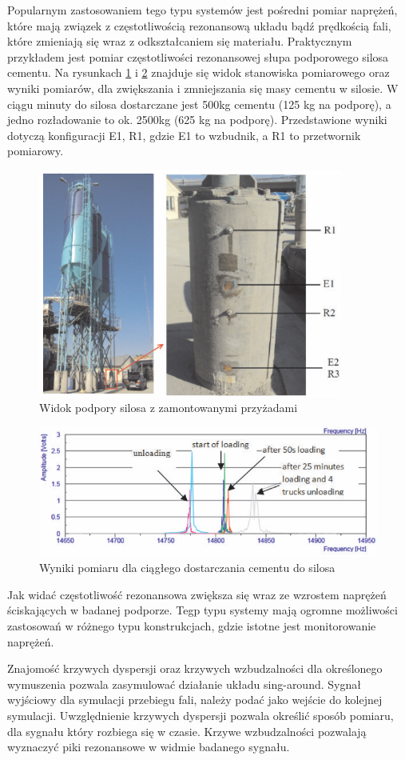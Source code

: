 Popularnym zastosowaniem tego typu systemów jest pośredni pomiar naprężeń, które mają związek z częstotliwością rezonansową układu bądź prędkością fali, które zmieniają się wraz z odkształcaniem się materiału. Praktycznym przykładem jest pomiar częstotliwości rezonansowej słupa podporowego silosa cementu. Na rysunkach \ref{fig:sing_around_silos} i \ref{fig:sing_around_wyniki} znajduje się widok stanowiska pomiarowego oraz wyniki pomiarów, dla zwiększania i zmniejszania się masy cementu w silosie. W ciągu minuty do silosa dostarczane jest 500kg cementu (125 kg na podporę), a jedno rozładowanie to ok. 2500kg (625 kg na podporę). Przedstawione wyniki dotyczą konfiguracji E1, R1, gdzie E1 to wzbudnik, a R1 to przetwornik pomiarowy.

\begin{figure}[h]
\centering
\includegraphics[width=10cm]{Zdjecia/2/sing_around_silos}
\caption{Widok podpory silosa z zamontowanymi przyżadami}
\label{fig:sing_around_silos}
\end{figure}

\begin{figure}[h]
\centering
\includegraphics[width=14cm]{Zdjecia/2/sing_around_wyniki}
\caption{Wyniki pomiaru dla ciągłego dostarczania cementu do silosa}
\label{fig:sing_around_wyniki}
\end{figure}

Jak widać częstotliwość rezonansowa zwiększa się wraz ze wzrostem naprężeń ściskających w badanej podporze. Tegp typu systemy mają ogromne możliwości zastosowań w różnego typu konstrukcjach, gdzie istotne jest monitorowanie naprężeń.

Znajomość krzywych dyspersji oraz krzywych wzbudzalności dla określonego wymuszenia pozwala zasymulować działanie układu sing-around. Sygnał wyjściowy dla symulacji przebiegu fali, należy podać jako wejście do kolejnej symulacji. Uwzględnienie krzywych dyspersji pozwala określić sposób pomiaru, dla sygnału który rozbiega się w czasie. Krzywe wzbudzalności pozwalają wyznaczyć piki rezonansowe w widmie badanego sygnału.

